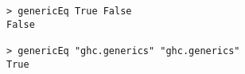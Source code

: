 \begin{repl}\begin{lstlisting}
> genericEq True False
False

> genericEq "ghc.generics" "ghc.generics"
True\end{lstlisting}\end{repl}
